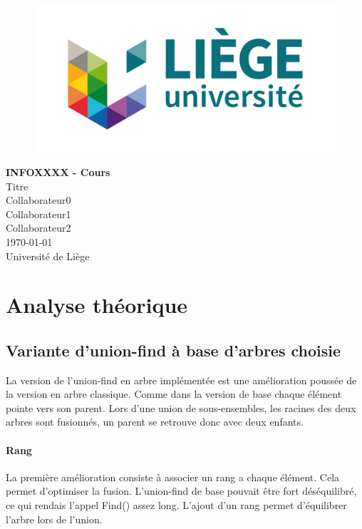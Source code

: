 \documentclass[11pt]{article}
\begin{document}
\begin{titlepage}

   \begin{figure}[htbp]
      \centering
      \includegraphics{uliege-logo-couleurs-300.jpg}
   \end{figure}
  	
  	\hfill

	\begin{center}
		\vfill
		\textbf{
		\Huge{INFOXXXX - Cours}}\\
		\bigskip
		\huge{Titre}\\
		\bigskip %
		\smallskip
		\Large{Collaborateur0\\Collaborateur1\\Collaborateur2} \\
		\bigskip
		\smallskip
		\large{\today}\\%
		\vfill
		\large{Université de Liège}
	\end{center}
\end{titlepage}
\clearpage
\clearpage
\section{Analyse théorique}
	\subsection{Variante d'union-find à base d'arbres choisie}
	La version de l'union-find en arbre implémentée est une amélioration poussée de la version en arbre classique. Comme dans la version de base chaque élément pointe vers son parent.
	Lors d'une union de sous-ensembles, les racines des deux arbres sont fusionnés, un parent se retrouve donc avec deux enfants.
	
	\paragraph{Rang}			
	La première amélioration consiste à associer un rang a chaque élément. Cela permet d'optimiser la fusion. L'union-find de base pouvait être fort déséquilibré, ce qui rendais l'appel Find() assez long. L'ajout d'un rang permet d'équilibrer l'arbre lors de l'union. 
	
\end{document}
